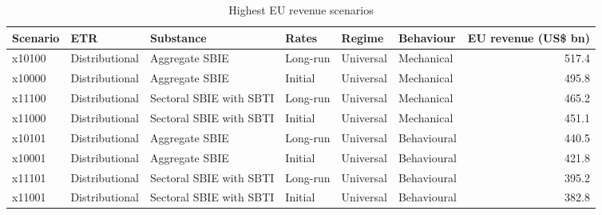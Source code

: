 \begin{table}[H]
\centering
\scriptsize
\caption{Highest EU revenue scenarios}
\label{tab:app_stage46_top_scenarios}
\begin{adjustbox}{max width=\textwidth,center}
\begin{tabular}{@{}llllllr@{}}
\toprule
Scenario & ETR & Substance & Rates & Regime & Behaviour & EU revenue (US\$ bn) \\
\midrule
x10100 & Distributional & Aggregate SBIE & Long-run & Universal & Mechanical & 517.4 \\
x10000 & Distributional & Aggregate SBIE & Initial & Universal & Mechanical & 495.8 \\
x11100 & Distributional & Sectoral SBIE with SBTI & Long-run & Universal & Mechanical & 465.2 \\
x11000 & Distributional & Sectoral SBIE with SBTI & Initial & Universal & Mechanical & 451.1 \\
x10101 & Distributional & Aggregate SBIE & Long-run & Universal & Behavioural & 440.5 \\
x10001 & Distributional & Aggregate SBIE & Initial & Universal & Behavioural & 421.8 \\
x11101 & Distributional & Sectoral SBIE with SBTI & Long-run & Universal & Behavioural & 395.2 \\
x11001 & Distributional & Sectoral SBIE with SBTI & Initial & Universal & Behavioural & 382.8 \\
\bottomrule
\end{tabular}
\end{adjustbox}
\end{table}
